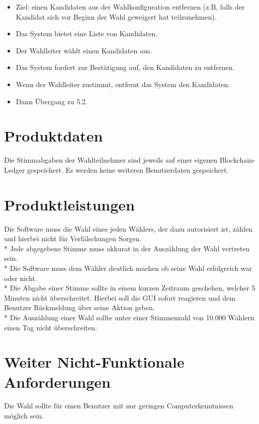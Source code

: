 \documentclass[parskip=full,11pt,twoside]{scrartcl}
\begin{document}
\begin{itemize}
	\item Ziel: einen Kandidaten aus der Wahlkonfiguration entfernen (z.B, falls der Kandidat sich vor Beginn der Wahl geweigert hat teilzunehmen).
	\item Das System bietet eine Liste von Kandidaten.
	\item Der Wahlleiter wählt einen Kandidaten aus.
	\item Das System fordert zur Bestätigung auf, den Kandidaten zu entfernen.
	\item Wenn der Wahlleiter zustimmt, entfernt das System den Kandidaten.
	\item Dann Übergang zu 5.2.
\end{itemize}

\section{Produktdaten}

Die Stimmabgaben der Wahlteilnehmer sind jeweils auf einer eigenen Blockchain-Ledger gespeichert.
Es werden keine weiteren Benutzerdaten gespeichert.

\section{Produktleistungen}
Die Software muss die Wahl eines jeden Wählers, der dazu autorisiert ist, zählen und hierbei nicht für Verfälschungen Sorgen. \\*
Jede abgegebene Stimme muss akkurat in der Auszählung der Wahl vertreten sein. \\*
Die Software muss dem Wähler deutlich machen ob seine Wahl erfolgreich war oder nicht. \\*
Die Abgabe einer Stimme sollte in einem kurzen Zeitraum geschehen, welcher 5 Minuten nicht überschreitet.
Hierbei soll die GUI sofort reagieren und dem Benutzer Rückmeldung über seine Aktion geben. \\*
Die Auszählung einer Wahl sollte unter einer Stimmenzahl von 10.000 Wählern einen Tag nicht überschreiten. 


\section{Weiter Nicht-Funktionale Anforderungen}

Die Wahl sollte für einen Benutzer mit nur geringen Computerkenntnissen möglich sein.
\end{document}
